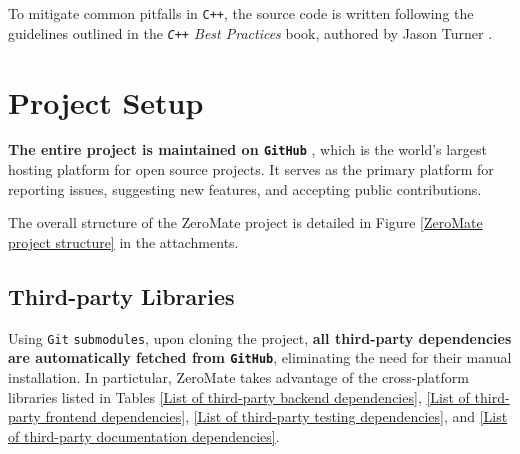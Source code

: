 \documentclass[english, ing, kiv, he, iso690numb, pdf]{fasthesis}
\begin{document}
	To mitigate common pitfalls in \texttt{C++}, the source code is written following the guidelines outlined in the \textit{\texttt{C++} Best Practices} book, authored by Jason Turner \cite{C++-Best-Practices}.
	
	\section{Project Setup}
	
	\textbf{The entire project is maintained on \texttt{GitHub}} \cite{ZeroMate}, which is the world's largest hosting platform for open source projects. It serves as the primary platform for reporting issues, suggesting new features, and accepting public contributions. 
	
	The overall structure of the ZeroMate project is detailed in Figure \ref{ZeroMate project structure} in the attachments.
	
	\subsection{Third-party Libraries}
	
	Using \texttt{Git} \texttt{submodules}, upon cloning the project, \textbf{all third-party dependencies are automatically fetched from \texttt{GitHub}}, eliminating the need for their manual installation. In partictular, ZeroMate takes advantage of the cross-platform libraries listed in Tables \ref{List of third-party backend dependencies}, \ref{List of third-party frontend dependencies}, \ref{List of third-party testing dependencies}, and \ref{List of third-party documentation dependencies}.
	
\end{document}
